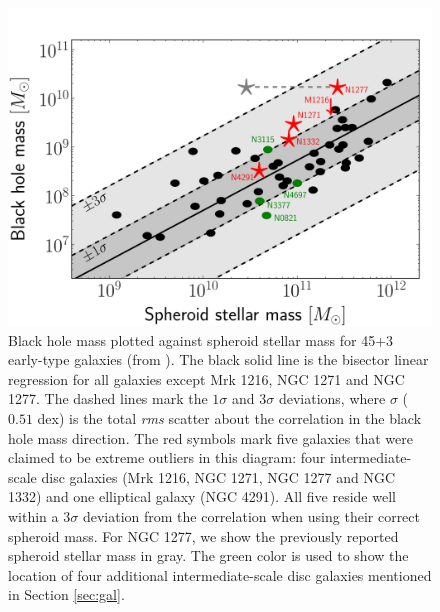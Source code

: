 \documentclass[useAMS,usenatbib,article]{mnras}
\begin{document}
\begin{figure}
\begin{center}
\includegraphics[width=\columnwidth]{mm.pdf}
\caption{Black hole mass plotted against spheroid stellar mass for 45+3 early-type galaxies (from \citealt{paperII}). 
The black solid line is the bisector linear regression for all galaxies except Mrk 1216, NGC 1271 and NGC 1277. 
The dashed lines mark the $1\sigma$ and $3\sigma$ deviations, 
where $\sigma$ ($0.51$ dex) is the total \emph{rms} scatter about the correlation in the black hole mass direction. 
The red symbols mark five galaxies that were claimed to be extreme outliers in this diagram: 
four intermediate-scale disc galaxies (Mrk 1216, NGC 1271, NGC 1277 and NGC 1332) and one elliptical galaxy (NGC 4291). 
All five reside well within a $3\sigma$ deviation from the correlation when using their correct spheroid mass. 
For NGC 1277, we show the previously reported spheroid stellar mass \citep{vandenbosch2012} in gray. 
The green color is used to show the location of four additional intermediate-scale disc galaxies mentioned in Section \ref{sec:gal}.}
\label{fig:mm}
\end{center}
\end{figure}
\end{document}
